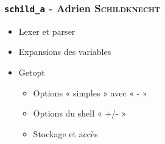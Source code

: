 \subsubsection{\texttt{schild\_a} - Adrien \textsc{Schildknecht}}

\begin{itemize}
    \item Lexer et parser
    \item Expansions des variables
    \item Getopt
        \begin{itemize}
            \item Options « simples » avec « - »
            \item Options du shell « +/- »
            \item Stockage et accès
        \end{itemize}
\end{itemize}
